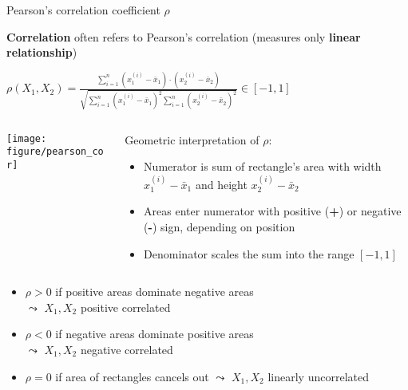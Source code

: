 \documentclass[10pt,compress,t,notes=noshow, xcolor=table]{beamer}
\begin{document}
\begin{frame}{Pearson's correlation coefficient $\rho$}

\textbf{Correlation} often refers to Pearson's correlation (measures only \textbf{linear relationship}) %
\smallskip



\centerline{$\rho(X_1, X_2) = \tfrac{\sum_{i=1}^{n}{(x_1^{(i)}-\bar{x}_1) \cdot (x_2^{(i)}-\bar{x}_2)}}{\sqrt{\sum_{i=1}^{n}{(x_1^{(i)}-\bar{x}_1)^2 \sum_{i=1}^{n}{(x_2^{(i)}-\bar{x}_2)^2 }}}} \in [-1, 1]$}

\bigskip

\begin{columns}[T, totalwidth=\textwidth]
\begin{column}{0.55\linewidth}
\texttt{[image: figure/pearson\_cor]}
\end{column}
\begin{column}{0.45\linewidth}

Geometric interpretation of $\rho$:
\begin{itemize}
    \item Numerator is sum of rectangle's area with width $x_1^{(i)}-\bar{x}_1$ and height $x_2^{(i)}-\bar{x}_2$
    \item Areas enter numerator with positive (\textbf{+}) or negative (\textbf{-}) sign, depending on position
    \item Denominator scales the sum into the range $[-1, 1]$
\end{itemize}
\end{column}
\end{columns}

\medskip
\pause
\begin{itemize}
    \item $\rho > 0$ if {\color{ggblue}positive areas} dominate {\color{ggred}negative areas} 
    \\$\leadsto$ $X_1, X_2$ positive correlated
    \item $\rho < 0$ if {\color{ggred}negative areas} dominate {\color{ggblue}positive areas} 
    \\$\leadsto$ $X_1, X_2$ negative correlated
    \item $\rho = 0$ if area of rectangles cancels out
    $\leadsto$ $X_1, X_2$ linearly uncorrelated
\end{itemize}

\end{frame}
\end{document}

